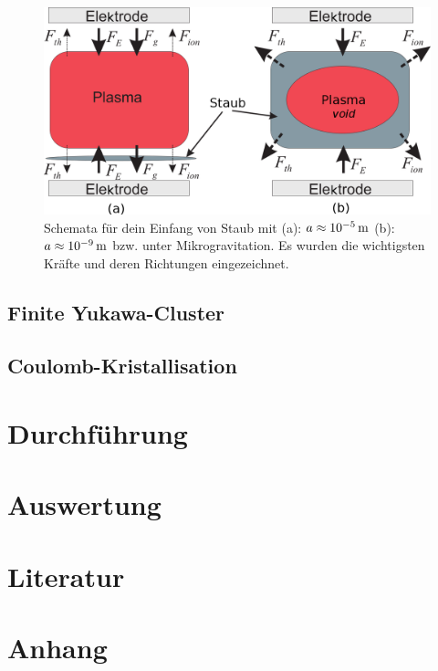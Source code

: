 \documentclass[numbers=noenddot,a4paper]{scrartcl}
\newcommand{\tenpo}[1]{ 10^{#1}}
\begin{document}
					\begin{figure}[H]
						\centering
						\includegraphics[width=\textwidth,height=0.5\textwidth]{figs/directionsofforcesandtrappingmelzer.png}
						\caption{Schemata für dein Einfang von Staub mit (a): $a\approx\unit[\tenpo{-5}]{m}$ (b): $a\approx\unit[\tenpo{-9}]{m}$ bzw. unter Mikrogravitation. Es wurden die wichtigsten Kräfte und deren Richtungen eingezeichnet.}
						\label{img:kräfterichtungen}
					\end{figure}
					
				
		\subsection{Finite Yukawa-Cluster}\label{subsec:yukawaclust}
					
		\subsection{Coulomb-Kristallisation}\label{subsec:coulombkristall}			
					
	\newpage
	
	\section{Durchführung}\label{sec:durch}
	
	\newpage
	
	\section{Auswertung}\label{sec:auswert}
	
	\newpage
	
	\section{Literatur}\label{sec:lit}
	
		
		
	
	\newpage
	
	\section{Anhang}\label{sec:anhang}
	
%		
%				
	
\end{document}
